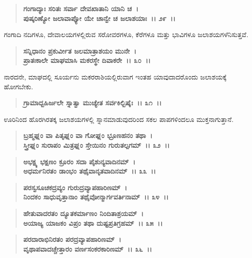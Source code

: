 \begin{verse}
\textbf{ಗಂಗಾದ್ಯಾಃ ಸರಿತಃ ಸರ್ವಾ ದೇವಖಾತಾನಿ ಯಾನಿ ಚ~।}\\\textbf{ಪುಷ್ಕರಿಣ್ಯೋ ಜಲಾವಾಪ್ಯೋ ಯೇ ಚಾನ್ವೇ ಚ ಜಲಾಶಯಾಃ~।। ೨೯~।।}
\end{verse}

ಗಂಗಾದಿ ನದಿಗಳೂ, ದೇವಾಲಯಗಳಲ್ಲಿರುವ ಸರೋವರಗಳೂ, ಕೆರೆಗಳೂ ಮತ್ತು ಭಾವಿಗಳೂ ಜಲಾಶಯಗಳೆನಿಸುತ್ತವೆ.

\begin{verse}
\textbf{ಸನ್ನಿಧಾನಂ ಪ್ರಕುರ್ವೀತ ಜಲಮಾತ್ರಾಶಯಂ ಮುನೇ~।}\\\textbf{ಪ್ರಾತಃಕಾಲೇ ಮಾಘಮಾಸಿ ಮಕರಸ್ಥೇ ದಿವಾಕರೇ~।। ೩೦~।।}
\end{verse}

ನಾರದನೇ, ಮಾಘದಲ್ಲಿ ಸೂರ್ಯನು ಮಕರರಾಶಿಯಲ್ಲಿರುವಾಗ ಇಂತಹ ಯಾವುದಾದರೊಂದು ಜಲಾಶಯಕ್ಕೆ ಹೋಗಬೇಕು.

\begin{verse}
\textbf{ಗ್ರಾಮಾದ್ಬಹಿರ್ಜಲೇ ಸ್ನಾತ್ವಾ ಮುಚ್ಯೇತ ಸರ್ವಕಿಲ್ಬಿಷೈಃ~।। ೩೧~।।}
\end{verse}

ಊರಿನಿಂದ ಹೊರಗಿರತಕ್ಕ ಜಲಾಶಯಗಳಲ್ಲಿ ಸ್ನಾನಮಾಡುವುದರಿಂದ ಸಕಲ ಪಾಪಗಳಿಂದಲೂ ಮುಕ್ತನಾಗುತ್ತಾನೆ.

\begin{verse}
\textbf{ಬ್ರಹ್ಮಘ್ನಂ ವಾ ಪಿತೃಘ್ನಂ ವಾ ಗೋಘ್ನಂ ಭ್ರೂಣಹನಂ ತಥಾ~।}\\\textbf{ಸ್ತ್ರೀಘ್ನಂ ಸುರಾಪಂ ಮಿತ್ರಘ್ನಂ ಸ್ತೇಯಿನಂ ಗುರುತಲ್ಪಗಮ್~।। ೩೨~।।}
\end{verse}

\begin{verse}
\textbf{ಅಭಕ್ಷ್ಯ ಭಕ್ಷಣಂ ಕ್ರೂರಂ ಸದಾ ಪೈಶುನ್ಯವಾದಿನಮ್~।}\\\textbf{ಅಧರ್ಮನಿರತಂ ಡಾಂಭಂ ತಥೈವಾನೃತವಾದಿನಮ್~।। ೩೩~।।}
\end{verse}

\begin{verse}
\textbf{ಪರಸ್ವಸೂಚಕದ್ರವ್ಯಂ ಗುರುದ್ರವ್ಯಾಪಹಾರಿಣಮ್~।}\\\textbf{ನಿಂದಕಂ ಸಾಧುವೃತ್ತಾನಾಂ ತಥೈವೋನ್ಮಾರ್ಗವರ್ತಿನಾಮ್~।। ೩೪~।।}
\end{verse}

\begin{verse}
\textbf{ಹೇತುವಾದರತಂ ದ್ಯೂತಕರ್ಮಾಣಂ ನಿಂದಿತಾಶ್ರಯಮ್~।}\\\textbf{ಅಯಾಜ್ಯ ಯಾಜಕಂ ವಿಪ್ರಂ ತಥಾ ದುಷ್ಟಪ್ರತಿಗ್ರಹಮ್~।। ೩೫~।।}
\end{verse}

\begin{verse}
\textbf{ಪರದಾರಾಭಿನಿರತಂ ಪರದ್ರವ್ಯಾಪಹಾರಿಣಮ್~।}\\\textbf{ವೃಥಾಪವಾದಚ್ಚೇತ್ತಾರಂ ವರ್ಣಸಂಕರಕಾರಿಣಮ್~।। ೩೬~।।}
\end{verse}

